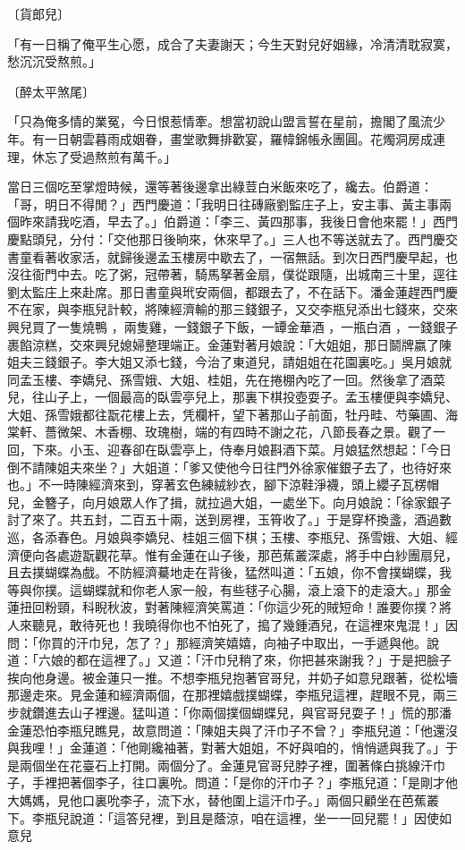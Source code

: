 〔貨郎兒〕

「有一日稱了俺平生心愿，成合了夫妻謝天；今生天對兒好姻緣，冷清清耽寂寞，愁沉沉受熬煎。」

〔醉太平煞尾〕

「只為俺多情的業冤，今日恨惹情牽。想當初說山盟言誓在星前，擔閣了風流少年。有一日朝雲暮雨成姻眷，畫堂歌舞排歡宴，羅幃錦帳永團圓。花燭洞房成連理，休忘了受過熬煎有萬千。」

當日三個吃至掌燈時候，還等著後邊拿出綠荳白米飯來吃了，纔去。伯爵道：「哥，明日不得閒？」西門慶道：「我明日往磚廠劉監庄子上，安主事、黃主事兩個昨來請我吃酒，早去了。」伯爵道：「李三、黃四那事，我後日會他來罷！」西門慶點頭兒，分付：「交他那日後晌來，休來早了。」三人也不等送就去了。西門慶交書童看著收家活，就歸後邊孟玉樓房中歇去了，一宿無話。到次日西門慶早起，也沒往衙門中去。吃了粥，冠帶著，騎馬拏著金扇，僕從跟隨，出城南三十里，逕往劉太監庄上來赴席。那日書童與玳安兩個，都跟去了，不在話下。潘金蓮趕西門慶不在家，與李瓶兒計較，將陳經濟輸的那三錢銀子，又交李瓶兒添出七錢來，交來興兒買了一隻燒鴨 ，兩隻雞，一錢銀子下飯，一罈金華酒 ，一瓶白酒 ，一錢銀子裹餡涼糕，交來興兒媳婦整理端正。金蓮對著月娘說：「大姐姐，那日鬬牌嬴了陳姐夫三錢銀子。李大姐又添七錢，今治了東道兒，請姐姐在花園裏吃。」吳月娘就同孟玉樓、李嬌兒、孫雪娥、大姐、桂姐，先在捲棚內吃了一回。然後拿了酒菜兒，往山子上，一個最高的臥雲亭兒上，那裏下棋投壺耍子。孟玉樓便與李嬌兒、大姐、孫雪娥都往翫花樓上去，凭欄杆，望下著那山子前面，牡丹畦、芍藥圃、海棠軒、薔微架、木香棚、玫瑰樹，端的有四時不謝之花，八節長春之景。觀了一回，下來。小玉、迎春卻在臥雲亭上，侍奉月娘斟酒下菜。月娘猛然想起：「今日倒不請陳姐夫來坐？」大姐道：「爹又使他今日往門外徐家催銀子去了，也待好來也。」不一時陳經濟來到，穿著玄色練絨紗衣，腳下涼鞋淨襪，頭上纓子瓦楞帽兒，金簪子，向月娘眾人作了揖，就拉過大姐，一處坐下。向月娘說：「徐家銀子討了來了。共五封，二百五十兩，送到房裡，玉筲收了。」于是穿杯換盞，酒過數巡，各添春色。月娘與李嬌兒、桂姐三個下棋；玉樓、李瓶兒、孫雪娥、大姐、經濟便向各處遊翫觀花草。惟有金蓮在山子後，那芭蕉叢深處，將手中白紗團扇兒，且去撲蝴蝶為戲。不防經濟驀地走在背後，猛然叫道：「五娘，你不會撲蝴蝶，我等與你撲。這蝴蝶就和你老人家一般，有些毬子心腸，滾上滾下的走滾大。」那金蓮扭回粉頸，科睨秋波，對著陳經濟笑罵道：「你這少死的賊短命！誰要你撲？將人來聽見，敢待死也！我曉得你也不怕死了，搗了幾鍾酒兒，在這裡來鬼混！」因問：「你買的汗巾兒，怎了？」那經濟笑嬉嬉，向袖子中取出，一手遞與他。說道：「六娘的都在這裡了。」又道：「汗巾兒稍了來，你把甚來謝我？」于是把臉子挨向他身邊。被金蓮只一推。不想李瓶兒抱著官哥兒，并奶子如意兒跟著，從松墻那邊走來。見金蓮和經濟兩個，在那裡嬉戲撲蝴蝶，李瓶兒這裡，趕眼不見，兩三步就鑽進去山子裡邊。猛叫道：「你兩個撲個蝴蝶兒，與官哥兒耍子！」慌的那潘金蓮恐怕李瓶兒瞧見，故意問道：「陳姐夫與了汗巾子不曾？」李瓶兒道：「他還沒與我哩！」金蓮道：「他剛纔袖著，對著大姐姐，不好與咱的，悄悄遞與我了。」于是兩個坐在花臺石上打開。兩個分了。金蓮見官哥兒脖子裡，圍著條白挑線汗巾子，手裡把著個李子，往口裏吮。問道：「是你的汗巾子？」李瓶兒道：「是剛才他大媽媽，見他口裏吮李子，流下水，替他圍上這汗巾子。」兩個只顧坐在芭蕉叢下。李瓶兒說道：「這答兒裡，到且是蔭涼，咱在這裡，坐一一回兒罷！」因使如意兒